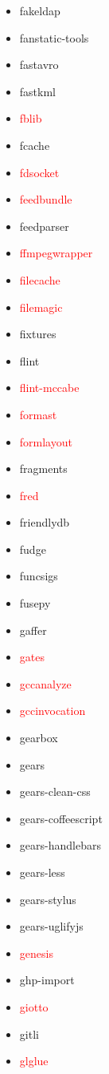 \documentclass{l4proj}
\begin{document}
\begin{appendices}
{\begin{itemize}
\item fakeldap
\item fanstatic-tools
\item fastavro
\item fastkml
\item\textcolor{red}{fblib}
\item fcache
\item\textcolor{red}{fdsocket}
\item\textcolor{red}{feedbundle}
\item feedparser
\item\textcolor{red}{ffmpegwrapper}
\item\textcolor{red}{filecache}
\item\textcolor{red}{filemagic}
\item fixtures
\item flint
\item\textcolor{red}{flint-mccabe}
\item\textcolor{red}{formast}
\item\textcolor{red}{formlayout}
\item fragments
\end{itemize}
}%
\noindent\parbox[t]{0.32\textwidth}{\raggedright%
\begin{itemize}
\item\textcolor{red}{fred}
\item friendlydb
\item fudge
\item funcsigs
\item fusepy
\item gaffer
\item\textcolor{red}{gates}
\item\textcolor{red}{gccanalyze}
\item\textcolor{red}{gccinvocation}
\item gearbox
\item gears
\item gears-clean-css
\item gears-coffeescript
\item gears-handlebars
\item gears-less
\item gears-stylus
\item gears-uglifyjs
\item\textcolor{red}{genesis}
\item ghp-import
\item\textcolor{red}{giotto}
\item gitli
\item\textcolor{red}{glglue}

\end{itemize}}
\end{appendices}
\end{document}
